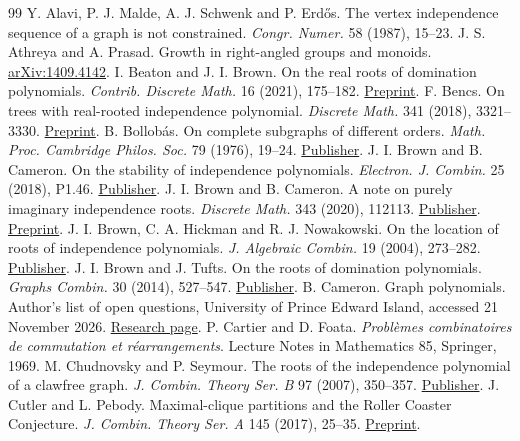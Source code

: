 \documentclass[11pt,a4paper]{article}
\begin{document}
\begin{thebibliography}{99}\small
{} Y. Alavi, P. J. Malde, A. J. Schwenk and P. Erd\H{o}s. The vertex independence sequence of a graph is not constrained. \emph{Congr. Numer.} 58 (1987), 15--23.
 J. S. Athreya and A. Prasad. Growth in right-angled groups and monoids. \href{https://arxiv.org/abs/1409.4142}{arXiv:1409.4142}.
 I. Beaton and J. I. Brown. On the real roots of domination polynomials. \emph{Contrib. Discrete Math.} 16 (2021), 175--182. \href{https://arxiv.org/abs/2012.15193}{Preprint}.
 F. Bencs. On trees with real-rooted independence polynomial. \emph{Discrete Math.} 341 (2018), 3321--3330. \href{https://arxiv.org/abs/1703.05409}{Preprint}.
 B. Bollob\'as. On complete subgraphs of different orders. \emph{Math. Proc. Cambridge Philos. Soc.} 79 (1976), 19--24. \href{https://doi.org/10.1017/S0305004100052063}{Publisher}.
 J. I. Brown and B. Cameron. On the stability of independence polynomials. \emph{Electron. J. Combin.} 25 (2018), P1.46. \href{https://doi.org/10.37236/7280}{Publisher}.
 J. I. Brown and B. Cameron. A note on purely imaginary independence roots. \emph{Discrete Math.} 343 (2020), 112113. \href{https://doi.org/10.1016/j.disc.2020.112113}{Publisher}. \href{https://arxiv.org/abs/2001.08881}{Preprint}.
 J. I. Brown, C. A. Hickman and R. J. Nowakowski. On the location of roots of independence polynomials. \emph{J. Algebraic Combin.} 19 (2004), 273--282. \href{https://doi.org/10.1023/B:JACO.0000030703.39946.70}{Publisher}.
 J. I. Brown and J. Tufts. On the roots of domination polynomials. \emph{Graphs Combin.} 30 (2014), 527--547. \href{https://doi.org/10.1007/s00373-013-1306-z}{Publisher}.
 B. Cameron. Graph polynomials. Author's list of open questions, University of Prince Edward Island, accessed 21 November 2026. \href{https://www.smcs.upei.ca/~brcameron/graphpolys.html}{Research page}.
 P. Cartier and D. Foata. \emph{Problèmes combinatoires de commutation et réarrangements}. Lecture Notes in Mathematics 85, Springer, 1969.
 M. Chudnovsky and P. Seymour. The roots of the independence polynomial of a clawfree graph. \emph{J. Combin. Theory Ser. B} 97 (2007), 350--357. \href{https://doi.org/10.1016/j.jctb.2006.06.001}{Publisher}.
 J. Cutler and L. Pebody. Maximal-clique partitions and the Roller Coaster Conjecture. \emph{J. Combin. Theory Ser. A} 145 (2017), 25--35. \href{https://arxiv.org/abs/1412.4595}{Preprint}.

\end{thebibliography}
\end{document}
